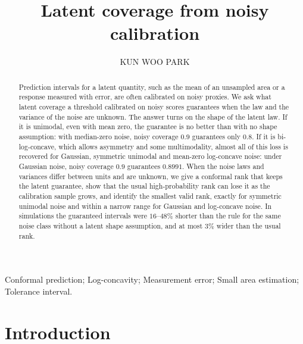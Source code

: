 \documentclass[lineno]{biometrika}
\begin{document}
\jvol{}
\jnum{}
\accessdate{}
\makeatletter\def\printhistory{}\makeatother %


\title{Latent coverage from noisy calibration}

\author{KUN WOO PARK}

\maketitle

\begin{abstract}
Prediction intervals for a latent quantity, such as the mean of an unsampled area or a response measured with error, are often calibrated on noisy proxies. We ask what latent coverage a threshold calibrated on noisy scores guarantees when the law and the variance of the noise are unknown. The answer turns on the shape of the latent law. If it is unimodal, even with mean zero, the guarantee is no better than with no shape assumption: with median-zero noise, noisy coverage $0.9$ guarantees only $0.8$. If it is bi-log-concave, which allows asymmetry and some multimodality, almost all of this loss is recovered for Gaussian, symmetric unimodal and mean-zero log-concave noise: under Gaussian noise, noisy coverage $0.9$ guarantees $0.8991$. When the noise laws and variances differ between units and are unknown, we give a conformal rank that keeps the latent guarantee, show that the usual high-probability rank can lose it as the calibration sample grows, and identify the smallest valid rank, exactly for symmetric unimodal noise and within a narrow range for Gaussian and log-concave noise. In simulations the guaranteed intervals were $16$--$48\%$ shorter than the rule for the same noise class without a latent shape assumption, and at most $3\%$ wider than the usual rank.
\end{abstract}

\begin{keywords}
Conformal prediction; Log-concavity; Measurement error; Small area estimation; Tolerance interval.
\end{keywords}

\section{Introduction}\label{sec:intro}
\end{document}
